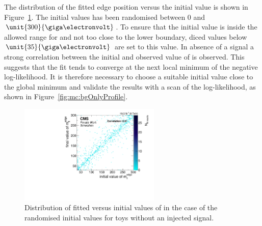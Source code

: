 The distribution of the fitted edge position versus the initial value is shown in Figure~\ref{fig:toys:backgroundOnlyFloatEdge}. The initial values has been randomised between 0 and $\unit{300}{\giga\electronvolt}$. To ensure that the initial value is inside the allowed range for \mlledge and not too close to the lower boundary, diced values below $\unit{35}{\giga\electronvolt}$ are set to this value. In absence of a signal a strong correlation between the initial and observed value of \mlledge is observed. This suggests that the fit tends to converge at the next local minimum of the negative log-likelihood. It is therefore necessary to choose a suitable initial value close to the global minimum and validate the results with a scan of the log-likelihood, as shown in Figure~\ref{fig:mc:bgOnlyProfile}. 

\begin{figure}[htbp]
  \centering

    \includegraphics[width=0.6\textwidth]{plots/results/fit/toyResults/fittedM0vsinitialM0_backgroundOnly_randM0_NegSig.pdf}
  \caption{Distribution of fitted versus initial values of \mlledge in the case of the randomised initial values for toys without an injected signal.}
  \label{fig:toys:backgroundOnlyFloatEdge}
\end{figure}

